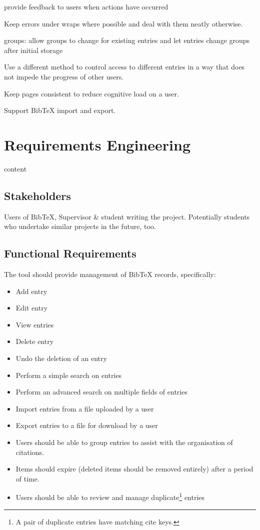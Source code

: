 \documentclass{l4proj}
\newcommand{\BibTeX}{B{\sc ib}\TeX}
\newcommand{\bibtex}{\BibTeX}
\begin{document}
provide feedback to users when actions have occurred 

Keep errors under wraps where possible and deal with them neatly otherwise.

groups: allow groups to change for existing entries and let entries change groups after initial storage

Use a different method to control access to different entries in a way that does not impede the progress of other users.

Keep pages consistent to reduce cognitive load on a user.

Support \bibtex{} import and export.



\chapter{Requirements Engineering}
\label{reqs}
content

\section{Stakeholders}
Users of \bibtex, Supervisor \& student writing the project. Potentially students who undertake similar projects in the future, too.

\section{Functional Requirements}
The tool should provide management of BibTeX records, specifically:
\begin{itemize}
\item Add entry
\item Edit entry
\item View entries
\item Delete entry
\item Undo the deletion of an entry
\item Perform a simple search on entries
\item Perform an advanced search on multiple fields of entries
\item Import entries from a file uploaded by a user
\item Export entries to a file for download by a user
\item Users should be able to group entries to assist with the organisation of citations.
\item Items should expire (deleted items should be removed entirely) after a period of time.
\item Users should be able to review and manage duplicate\footnote{A pair of duplicate entries have matching cite keys.} entries
\end{itemize}
\end{document}

